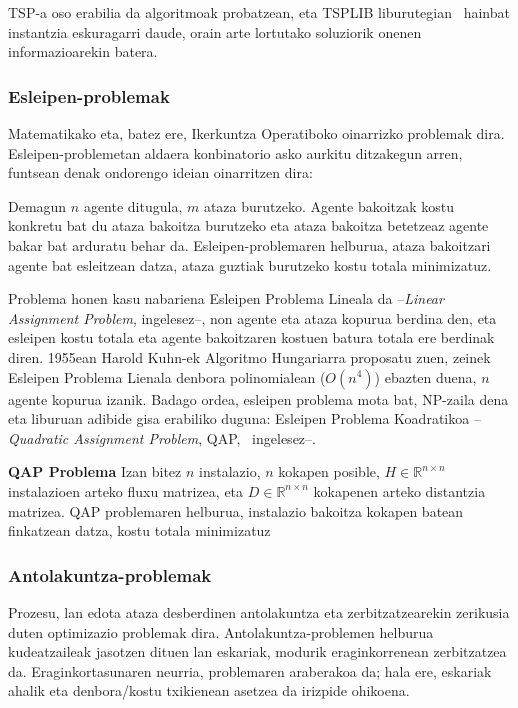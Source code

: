 \documentclass[eu]{ifirak}\usepackage[]{graphicx}\usepackage[]{color}
\begin{document}
TSP-a oso erabilia da algoritmoak probatzean, eta TSPLIB liburutegian~\cite{reinelt1990} hainbat instantzia eskuragarri daude, orain arte lortutako soluziorik onenen informazioarekin batera.

\subsubsection{Esleipen-problemak}

Matematikako eta, batez ere, Ikerkuntza Operatiboko oinarrizko problemak dira. Esleipen-problemetan aldaera konbinatorio asko aurkitu ditzakegun arren, funtsean denak ondorengo ideian oinarritzen dira:

Demagun $n$ agente ditugula, $m$ ataza burutzeko. Agente bakoitzak kostu konkretu bat du ataza bakoitza burutzeko eta ataza bakoitza betetzeaz agente bakar bat arduratu behar da.  Esleipen-problemaren helburua, ataza bakoitzari agente bat esleitzean datza, ataza guztiak burutzeko kostu totala minimizatuz.

Problema honen kasu nabariena Esleipen Problema Lineala da --\textit{Linear Assignment Problem}, ingelesez--, non agente eta ataza kopurua berdina den, eta esleipen kostu totala eta agente bakoitzaren kostuen batura totala ere berdinak diren. 1955ean Harold Kuhn-ek Algoritmo Hungariarra proposatu zuen, zeinek Esleipen Problema Lienala denbora polinomialean ($O(n^4)$) ebazten duena, $n$ agente kopurua izanik. Badago ordea, esleipen problema mota bat, NP-zaila dena eta liburuan adibide gisa erabiliko duguna: Esleipen Problema Koadratikoa --\textit{Quadratic Assignment Problem}, QAP,~\cite{burkard1998} ingelesez--.

\begin{ifdefinition} {\bf QAP Problema} Izan bitez $n$ instalazio, $n$ kokapen posible, $H\in\mathbb{R}^{n\times n}$ instalazioen arteko fluxu matrizea, eta $D\in\mathbb{R}^{n\times n}$ kokapenen arteko distantzia matrizea. QAP problemaren helburua, instalazio bakoitza kokapen batean finkatzean datza, kostu totala minimizatuz
\end{ifdefinition}


\subsubsection{Antolakuntza-problemak}

Prozesu, lan edota ataza desberdinen antolakuntza eta zerbitzatzearekin zerikusia duten optimizazio problemak dira. Antolakuntza-problemen helburua kudeatzaileak jasotzen dituen lan eskariak, modurik eraginkorrenean zerbitzatzea da. Eraginkortasunaren neurria, problemaren araberakoa da; hala ere, eskariak ahalik eta denbora/kostu txikienean asetzea da irizpide ohikoena.
\end{document}
